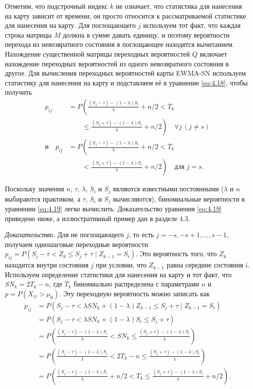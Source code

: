 Отметим, что подстрочный индекс \(k\) не означает, что статистика для нанесения на карту зависит от времени; он просто относится к рассматриваемой статистике для нанесения на карту. Для поглощающего \(j\) используем тот факт, что каждая строка матрицы \(M\) должна в сумме давать единицу, и поэтому вероятности перехода из невозвратного состояния в поглощающее находятся вычитанием. Нахождение существенной матрицы переходных вероятностей \(Q\) включает нахождение переходных вероятностей из одного невозвратного состояния в другое. Для вычисления переходных вероятностей карты EWMA-SN используем статистику для нанесения на карту и подставляем её в уравнение \eqref{eq:4.18}, чтобы получить
\begin{equation}
	\begin{aligned}
		p_{ij} &= P\left( \frac{(S_j - \tau) - (1 - \lambda)S_i}{\lambda} + n \Big/ 2 < T_k \right. \\
		&\qquad \left. \le \frac{(S_j + \tau) - (1 - \lambda)S_i}{\lambda} + n \Big/ 2 \right) \quad \forall j\, (j \ne s) \\
		\text{и}\quad p_{ij} &= P\left( \frac{(S_j - \tau) - (1 - \lambda)S_i}{\lambda} + n \Big/ 2 < T_k \right. \\
		&\qquad \left. < \frac{(S_j + \tau) - (1 - \lambda)S_i}{\lambda} + n \Big/ 2 \right) \quad \text{для } j = s.
	\end{aligned}
	\label{eq:4.19}
\end{equation}

Поскольку значения \(n\), \(\tau\), \(\lambda\), \(S_i\) и \(S_j\) являются известными постоянными (\(\lambda\) и \(n\) выбираются практиком, а \(\tau\), \(S_i\) и \(S_j\) вычисляются), биномиальные вероятности в уравнении \eqref{eq:4.19} легко вычислить. Доказательство уравнения \eqref{eq:4.19} приведено ниже, а иллюстративный пример дан в разделе 4.3.

\emph{Доказательство.} Для не поглощающего \(j\), то есть \(j = -s, -s + 1, \ldots, s - 1\), получаем одношаговые переходные вероятности \(p_{ij} = P(S_j - \tau < Z_k \le S_j + \tau \mid Z_{k-1} = S_i)\). Это вероятность того, что \(Z_k\) находится внутри состояния \(j\) при условии, что \(Z_{k-1}\) равна середине состояния \(i\). Используем определение статистики для нанесения на карту и тот факт, что \(SN_k = 2T_k - n\), где \(T_k\) биномиально распределена с параметрами \(n\) и \(p = P(X_{ij} > \mu_0)\). Эту переходную вероятность можно записать как
\begin{align*}
	p_{ij} &= P(S_j - \tau < \lambda SN_k + (1 - \lambda)Z_{k-1} \le S_j + \tau \mid Z_{k-1} = S_i) \\
	&= P(S_j - \tau < \lambda SN_k + (1 - \lambda)S_i \le S_j + \tau) \\
	&= P\left( \frac{(S_j - \tau) - (1 - \lambda)S_i}{\lambda} < SN_k \le \frac{(S_j + \tau) - (1 - \lambda)S_i}{\lambda} \right) \\
	&= P\left( \frac{(S_j - \tau) - (1 - \lambda)S_i}{\lambda} < 2T_k - n \le \frac{(S_j + \tau) - (1 - \lambda)S_i}{\lambda} \right) \\
	&= P\left( \frac{(S_j - \tau) - (1 - \lambda)S_i}{\lambda} + n \Big/2 < T_k \le \frac{(S_j + \tau) - (1 - \lambda)S_i}{\lambda} + n \Big/2 \right).
\end{align*}

